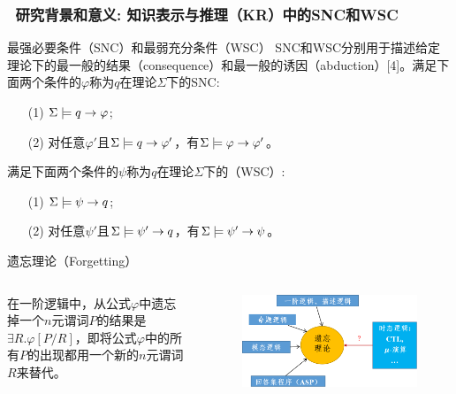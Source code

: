 \documentclass[9pt, CJK]{beamer}
\begin{document}
	\begin{frame}
		\frametitle{~研究背景和意义: {\small 知识表示与推理（KR）中的SNC和WSC}}
		{\small\begin{block}{最强必要条件（SNC）和最弱充分条件（WSC）}
			SNC和WSC分别用于描述给定理论下的最一般的结果（consequence）和最一般的诱因（abduction）[4]。满足下面两个条件的$\varphi$称为$q$在理论$\Sigma$下的SNC:
			\begin{itemize}
				\item[(1)] $\Sigma \models q \rightarrow \varphi$;
				\item[(2)] 对任意$\varphi'$且$\Sigma \models q \rightarrow \varphi'$，有$\Sigma \models \varphi \rightarrow \varphi'$。
			\end{itemize}
		满足下面两个条件的$\psi$称为$q$在理论$\Sigma$下的（WSC）:
		\begin{itemize}
			\item[(1)] $\Sigma \models \psi \rightarrow q$; 
			\item[(2)] 对任意$\psi'$且$\Sigma \models \psi' \rightarrow q$，有$\Sigma \models \psi' \rightarrow \psi$。
		\end{itemize}
		\end{block}}
		\vskip 0.5pt
		{\small\begin{block}{遗忘理论（Forgetting）}
			\begin{columns}
				 在一阶逻辑中，从公式$\varphi$中遗忘掉一个$n$元谓词$P$的结果是$\exists R.\varphi[P/R]$，即将公式$\varphi$中的所有$P$的出现都用一个新的$n$元谓词$R$来替代。 
				\begin{figure}
					\includegraphics[scale=0.35]{figures/forgetting}
				\end{figure}
			\end{columns}
		\end{block}}
	\end{frame}
	
\end{document}
